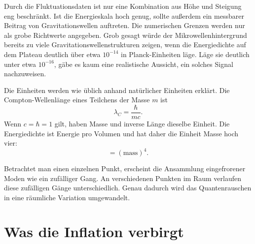 Durch die Fluktuationsdaten ist nur eine Kombination aus Höhe und Steigung eng beschränkt. Ist die Energieskala hoch genug, sollte außerdem ein messbarer Beitrag von Gravitationswellen auftreten. Die numerischen Grenzen werden nur als grobe Richtwerte angegeben. Grob gesagt würde der Mikrowellenhintergrund bereits zu viele Gravitationswellenstrukturen zeigen, wenn die Energiedichte auf dem Plateau deutlich über etwa \(10^{-14}\) in Planck-Einheiten läge. Läge sie deutlich unter etwa \(10^{-16}\), gäbe es kaum eine realistische Aussicht, ein solches Signal nachzuweisen. 

Die Einheiten werden wie üblich anhand natürlicher Einheiten erklärt. Die Compton-Wellenlänge eines Teilchens der Masse \(m\) ist
\begin{equation}
\lambda_C=\frac{\hbar}{mc}.
\end{equation}
Wenn \(c=\hbar=1\) gilt, haben Masse und inverse Länge dieselbe Einheit. Die Energiedichte ist Energie pro Volumen und hat daher die Einheit Masse hoch vier:
\begin{equation}
[\rho]=(\mathrm{mass})^4.
\end{equation}

Betrachtet man einen einzelnen Punkt, erscheint die Ansammlung eingefrorener Moden wie ein zufälliger Gang. An verschiedenen Punkten im Raum verlaufen diese zufälligen Gänge unterschiedlich. Genau dadurch wird das Quantenrauschen in eine räumliche Variation umgewandelt.

\begin{classroomqa}
\end{classroomqa}

\section{Was die Inflation verbirgt}

